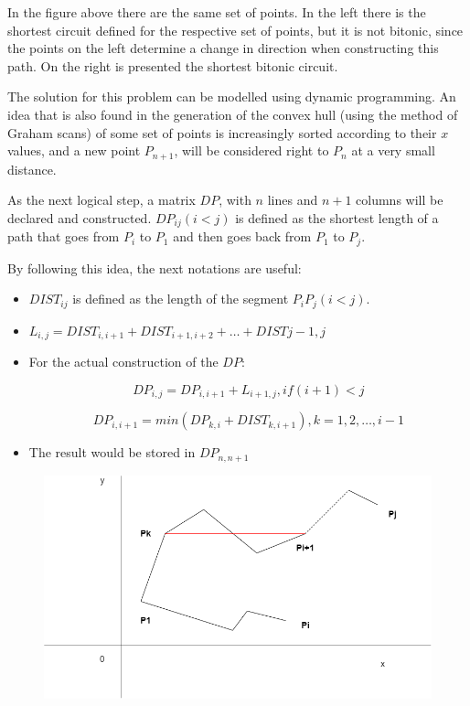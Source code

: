 \documentclass[letterpaper]{article}
\begin{document}
In the figure above there are the same set of points. In the left there is the shortest circuit defined for the respective set of points, but it is not bitonic, since the points on the left determine a change in direction when constructing this path. On the right is presented the shortest bitonic circuit.

The solution for this problem can be modelled using dynamic programming. An idea that is also found in the generation of the convex hull (using the method of Graham scans) of some set of points is increasingly sorted according to their $x$ values, and a new point $P_{n + 1}$, will be considered right to $P_{n}$ at a very small distance.

As the next logical step, a matrix $DP$, with $n$ lines and $n + 1$ columns will be declared and constructed. $DP_{ij} (i < j)$ is defined as the shortest length of a path that goes from $P_{i}$ to $P_{1}$ and then goes back from $P_{1}$ to $P_{j}$.

By following this idea, the next notations are useful:

\begin{itemize}
    \item $DIST_{ij}$ is defined as the length of the segment $P_{i} P_{j} (i < j)$.
    \item $L_{i,j} = DIST_{i,i + 1} + DIST_{i + 1, i + 2} + \dots +DIST{j - 1,j}$
    \item For the actual construction of the $DP$:

    $$
    DP_{i,j} = DP_{i, i + 1} + L_{i + 1, j}, if (i + 1) < j
    $$

    $$
    DP_{i, i + 1} = min(DP_{k, i} + DIST_{k, i + 1}), k = 1,2,\dots, i - 1
    $$
    
    \item The result would be stored in $DP_{n, n + 1}$ 
\end{itemize}

\begin{figure} [h!]
\centering
\includegraphics[width=1\textwidth]{pngOfDiagrams/bitonic2.png}
\end{figure}
\end{document}
